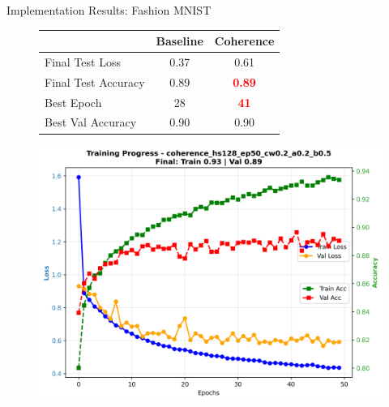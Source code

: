 \documentclass[9pt,dvipsnames]{beamer}
\begin{document}
\begin{frame}{Implementation Results: Fashion MNIST}
\begin{figure}[H]
\begin{minipage}[b]{0.48\textwidth}
            \vspace{0.1\textheight}
            {\scriptsize
            \begin{tabular}{lcc}
                \toprule
                & \textbf{Baseline} & \textbf{Coherence} \\
                \midrule
                Final Test Loss & 0.37 & 0.61 \\
                Final Test Accuracy & 0.89 & \textbf{\textcolor{red}{0.89}} \\
                Best Epoch & 28 & \textbf{\textcolor{red}{41}} \\
                Best Val Accuracy & 0.90 & 0.90 \\
                \bottomrule
            \end{tabular}
            }
			\vspace{0.15\textheight}
        \end{minipage}%
        \hfill
        \begin{minipage}[b]{0.48\textwidth}
            \centering
            \includegraphics[width=\textwidth,height=0.48\textheight,keepaspectratio]{../plots/mlp/fashion_mnist/hs128_ep50/coherence_hs128_ep50_cw0.2_a0.2_b0.5_training_curves.png} \\
            \vspace{0.5em}

\end{minipage}
\end{figure}
\end{frame}
\end{document}
